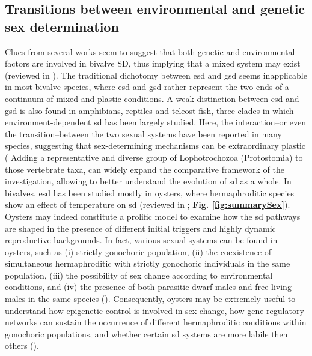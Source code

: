 \subsection{Transitions between environmental and genetic sex determination}
Clues from several works seem to suggest that both genetic and environmental factors are involved in bivalve SD, thus implying that a mixed system may exist (reviewed in \textbf{\cite{breton2018sex}}). The traditional dichotomy between \gls{esd} and \gls{gsd} seems inapplicable in most bivalve species, where \gls{esd} and \gls{gsd} rather represent the two ends of a continuum of mixed and plastic conditions.  A weak distinction between \gls{esd} and \gls{gsd} is also found in amphibians, reptiles and teleost fish, three clades in which environment-dependent \gls{sd} has been largely studied. Here, the interaction–or even the transition–between the two sexual systems have been reported in many species, suggesting that sex-determining mechanisms can be extraordinary plastic (\textbf{\cite{bachtrog2014sex, capel2017vertebrate}} Adding a representative and diverse group of Lophotrochozoa (Protostomia) to those vertebrate taxa, can widely expand the comparative framework of the investigation, allowing to better understand the evolution of \gls{sd} as a whole. In bivalves, \gls{esd} has been studied mostly in oysters, where hermaphroditic species show an effect of temperature on \gls{sd} (reviewed in \textbf{\cite{breton2018sex}}; \textbf{Fig. \ref{fig:summarySex}}). Oysters may indeed constitute a prolific model to examine how the \gls{sd} pathways are shaped in the presence of different initial triggers and highly dynamic reproductive backgrounds. In fact, various sexual systems can be found in oysters, such as (i) strictly gonochoric population, (ii) the coexistence of simultaneous hermaphroditic with strictly gonochoric individuals in the same population, (iii) the possibility of sex change according to environmental conditions, and (iv) the presence of both parasitic dwarf males and free-living males in the same species (\textbf{\cite{collin2013phylogenetic}}). Consequently, oysters may be extremely useful to understand how epigenetic control is involved in sex change, how gene regulatory networks can sustain the occurrence of different hermaphroditic conditions within gonochoric populations, and whether certain \gls{sd} systems are more labile then others (\textbf{\cite{abbott2011intra}}).

